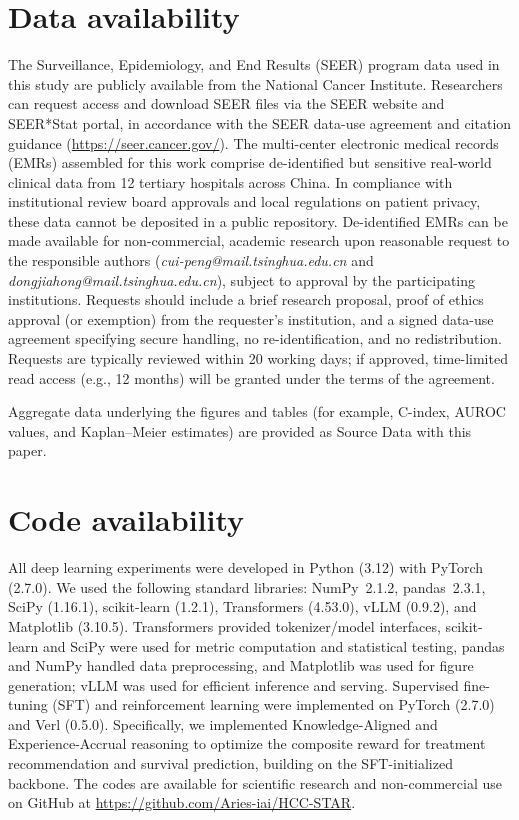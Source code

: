 \documentclass{article}
\begin{document}
\section{Data availability}\label{sec5}
The Surveillance, Epidemiology, and End Results (SEER) program data used in this study are publicly available from the National Cancer Institute. Researchers can request access and download SEER files via the SEER website and SEER*Stat portal, in accordance with the SEER data-use agreement and citation guidance (\url{https://seer.cancer.gov/}). 
The multi-center electronic medical records (EMRs) assembled for this work comprise de-identified but sensitive real-world clinical data from 12 tertiary hospitals across China. In compliance with institutional review board approvals and local regulations on patient privacy, these data cannot be deposited in a public repository. De-identified EMRs can be made available for non-commercial, academic research upon reasonable request to the responsible authors (\textit{cui-peng@mail.tsinghua.edu.cn} and \textit{dongjiahong@mail.tsinghua.edu.cn}), subject to approval by the participating institutions. Requests should include a brief research proposal, proof of ethics approval (or exemption) from the requester’s institution, and a signed data-use agreement specifying secure handling, no re-identification, and no redistribution. Requests are typically reviewed within 20 working days; if approved, time-limited read access (e.g., 12 months) will be granted under the terms of the agreement.

Aggregate data underlying the figures and tables (for example, C-index, AUROC values, and Kaplan–Meier estimates) are provided as Source Data with this paper.


\section{Code availability}\label{sec6}
All deep learning experiments were developed in Python (3.12) with PyTorch (2.7.0). We used the following standard libraries: NumPy~2.1.2, pandas~2.3.1, SciPy (1.16.1), scikit-learn (1.2.1), Transformers (4.53.0), vLLM (0.9.2), and Matplotlib (3.10.5). Transformers provided tokenizer/model interfaces, scikit-learn and SciPy were used for metric computation and statistical testing, pandas and NumPy handled data preprocessing, and Matplotlib was used for figure generation; vLLM was used for efficient inference and serving. Supervised fine-tuning (SFT) and reinforcement learning were implemented on PyTorch (2.7.0) and Verl (0.5.0).
Specifically, we implemented {Knowledge-Aligned and Experience-Accrual reasoning} to optimize the composite reward for treatment recommendation and survival prediction, building on the SFT-initialized backbone. 
The codes are available for scientific research and non-commercial use on GitHub at \url{https://github.com/Aries-iai/HCC-STAR}.
\end{document}
